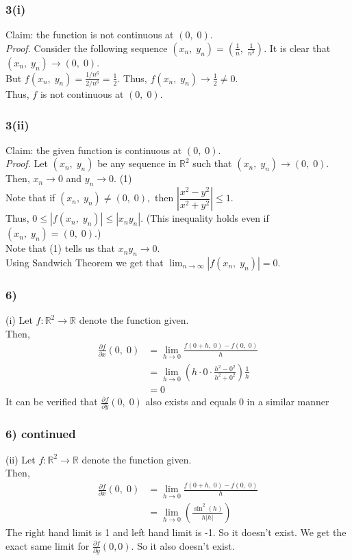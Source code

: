 \documentclass[handout]{beamer}
\begin{document}
\begin{frame}
	\frametitle{3(i)}
    Claim: the function is not continuous at $(0,\;0).$\\
	\emph{Proof.} Consider the following sequence $(x_n,\;y_n) = \left(\frac{1}{n},\;\frac{1}{n^3}\right).$ It is clear that $(x_n,\;y_n) \to (0,\;0).$\\
	But $f(x_n,\;y_n) = \frac{1/n^6}{2/n^6} = \frac{1}{2}.$ Thus, $f(x_n,\;y_n) \to \frac{1}{2} \neq 0.$\\
	Thus, $f$ is not continuous at $(0,\;0).$
\end{frame}

\begin{frame}
	\frametitle{3(ii)}
    Claim: the given function is continuous at $(0,\;0).$\\
	\emph{Proof.} Let $(x_n,\;y_n)$ be any sequence in $\mathbb{R}^2$ such that $(x_n,\;y_n) \to (0,\;0).$ Then, $x_n \to 0$ and $y_n \to 0.$ \hfill (1)\\
	Note that if $(x_n,\;y_n) \neq (0,\;0),$ then $\left|\dfrac{x^2 - y^2}{x^2 + y^2}\right| \le 1.$\\
	Thus, $0 \le |f(x_n,\;y_n)| \le \left|x_ny_n\right|.$ \hfill (This inequality holds even if $(x_n,\;y_n) = (0,\;0).$)\\
	Note that (1) tells us that $x_ny_n \to 0.$\\
    Using Sandwich Theorem we get that $\displaystyle\lim_{n\to \infty}|f(x_n,\;y_n)| = 0$. 

\end{frame}

\begin{frame}
	\frametitle{6)}
    (i) Let $f:\mathbb{R}^2 \to \mathbb{R}$ denote the function given.\\
	Then, 
	\begin{align*}
		\frac{\partial f}{\partial x}(0,\;0) &= \displaystyle\lim_{h\to 0}\frac{f(0+h,\;0) - f(0,\;0)}{h}\\
		&= \displaystyle\lim_{h\to 0}\left(h\cdot0\cdot\frac{h^2 - 0^2}{h^2 + 0^2}\right)\frac{1}{h} \\
		&= 0
	\end{align*}
	It can be verified that $\frac{\partial f}{\partial y}(0,\;0)$ also exists and equals $0$ in a similar manner
\end{frame}

\begin{frame}
	\frametitle{6) continued}
	(ii) Let $f:\mathbb{R}^2 \to \mathbb{R}$ denote the function given.\\
	Then, 
	\begin{align*}
		\frac{\partial f}{\partial x}(0,\;0) &= \displaystyle\lim_{h\to 0}\frac{f(0+h,\;0) - f(0,\;0)}{h}\\
		&= \displaystyle\lim_{h\to 0}\left(\frac{\sin^2(h)}{h|h|}\right)
	\end{align*}
	The right hand limit is 1 and left hand limit is -1. So it doesn't exist. We get the exact same limit for $\frac{\partial f}{\partial y}(0,0)$. So it also doesn't exist.

\end{frame}
\end{document}
